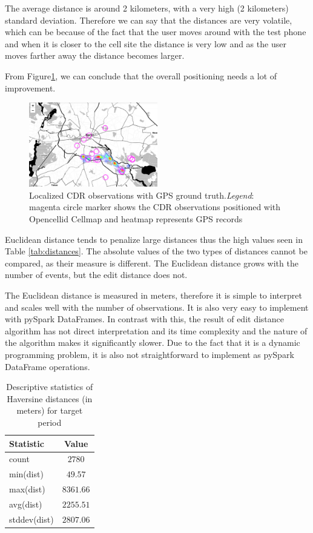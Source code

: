 The average distance is around 2 kilometers, with a very high (2 kilometers) standard deviation. Therefore we can say that the distances are very volatile, which can be because of the fact that the user moves around with the test phone and when it is closer to the cell site the distance is very low and as the user moves farther away the distance becomes larger.

From Figure\ref{fig:traj}, we can conclude that the overall positioning needs a lot of improvement. 

\begin{figure}[h]
    \centering
    \includegraphics[width=0.5\textwidth]{images/traj.png}
    \caption{Localized CDR observations with GPS ground truth.\textit{Legend}: magenta circle marker shows the CDR observations positioned with Opencellid Cellmap and heatmap represents GPS records}
    \label{fig:traj}
\end{figure}

Euclidean distance tends to penalize large distances thus the high values seen in Table \ref{tab:distances}. The absolute values of the two types of distances cannot be compared, as their measure is different. The Euclidean distance grows with the number of events, but the edit distance does not. 

The Euclidean distance is measured in meters, therefore it is simple to interpret and scales well with the number of observations. It is also very easy to implement with pySpark DataFrames. In contrast with this, the result of edit distance algorithm has not direct interpretation and its time complexity and the nature of the algorithm makes it significantly slower. Due to the fact that it is a dynamic programming problem, it is also not straightforward to implement as pySpark DataFrame operations.

\begin{table}[h]
    \centering
    \begin{tabular}{|l|c|}
        \hline
        \textbf{Statistic} & \textbf{Value} \\
        \hline 
        count & $2780$ \\
        \hline
        min(dist) &  $49.57$\\
        \hline
        max(dist) &   $8361.66$\\
        \hline
        avg(dist) &  $2255.51$\\
        \hline
        stddev(dist) &  $2807.06$\\
        \hline
    \end{tabular}
    \caption{Descriptive statistics of Haversine distances (in meters) for target period}
    \label{tab:dist_stats}
\end{table}


